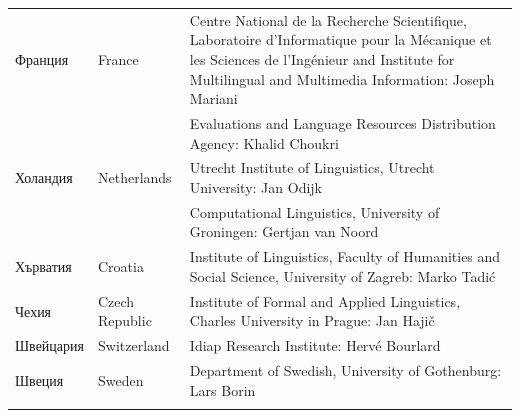 \begin{longtable}{@{}llp{110mm}@{}}
    Франция & \textcolor{grey1}{France} & Centre National de la Recherche Scientifique, Laboratoire d'Informatique pour la Mécanique et les Sciences de l'Ingénieur and Institute for Multilingual and Multimedia Information: Joseph Mariani \\ \addlinespace
    & & Evaluations and Language Resources Distribution Agency: Khalid Choukri\\ \addlinespace 
    Холандия & \textcolor{grey1}{Netherlands} & Utrecht Institute of Linguistics, Utrecht University: Jan Odijk\\ \addlinespace 
    & & Computational Linguistics, University of Groningen: Gertjan van
    Noord\\ \addlinespace
    Хърватия & \textcolor{grey1}{Croatia} & Institute of Linguistics,
    Faculty of Humanities and Social Science, University of Zagreb:
    Marko Tadić \\ \addlinespace
    Чехия & \textcolor{grey1}{Czech Republic} & Institute of Formal and Applied Linguistics, Charles University in Prague: Jan Hajič \\ \addlinespace
    Швейцария & \textcolor{grey1}{Switzerland} & Idiap Research
    Institute: Hervé Bourlard \\ \addlinespace 
    Швеция & \textcolor{grey1}{Sweden} & Department of Swedish, University of Gothenburg: Lars Borin \\ \addlinespace 
  \end{longtable}
  \normalsize

  \renewcommand*{\figureformat}{}
  \renewcommand*{\captionformat}{}

